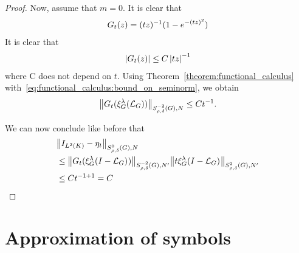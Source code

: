 \begin{proof}
    Now, assume that $m = 0$.
    It is clear that
    \begin{align*}
        G_t(z) = (t z)^{-1} (1 - \e^{-(t z)^2})
    \end{align*}
    It is clear that
    \begin{align*}
        \abs {G_t(z)} \leq C \abs {t z}^{-1}
    \end{align*}
    where C does not depend on $t$.
    Using Theorem~\ref{theorem:functional_calculus} with~\eqref{eq:functional_calculus:bound_on_seminorm},
    we obtain
    \begin{align*}
        \SymbolSemiNorm {-2} {\rho, \delta} N {G_t(\Rep \lambda (\Laplacian))}
        \leq C t^{-1}.
    \end{align*}

    We can now conclude like before that
    \begin{align*}
        &\SymbolSemiNorm {0} {\rho, \delta } N {\Id {\Lebesgue 2 \CompactGroup} - \eta_t}\\
        &\leq
        \SymbolSemiNorm {-2} {\rho, \delta} {N'} {G_t(\Rep \lambda \BesselPotentialSquared {})}
        \SymbolSemiNorm {2} {\rho, \delta} {N'} {t \Rep \lambda \BesselPotentialSquared {}}\\
        &\leq C t^{-1 + 1} = C
    \end{align*}
\end{proof}

\section{Approximation of symbols}

